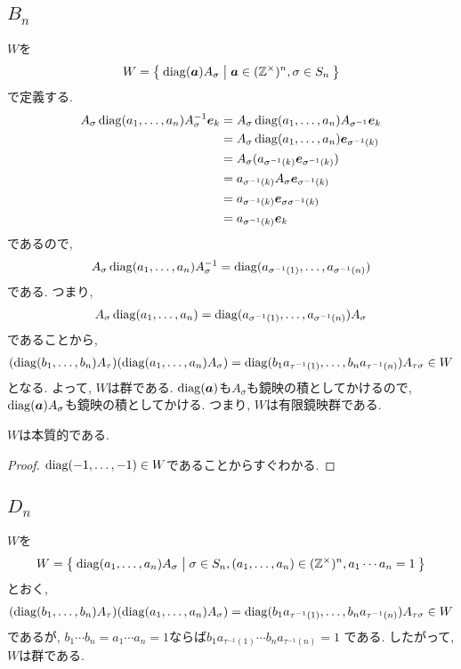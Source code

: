 \subsection{$B_n$}
\label{ex:bn:grp}
$W$を
\begin{align*}
  W=\Set{\operatorname{diag}(\boldsymbol{a})A_\sigma|\boldsymbol{a}\in (\mathbb{Z}^\times)^n, \sigma\in S_n}
\end{align*}
で定義する.
\begin{align*}
  A_\sigma \operatorname{diag}(a_1,\ldots,a_n)A_{\sigma}^{-1}\boldsymbol{e}_{k}
&=  A_\sigma \operatorname{diag}(a_1,\ldots,a_n)A_{\sigma^{-1}}\boldsymbol{e}_{k}\\
&=  A_\sigma \operatorname{diag}(a_1,\ldots,a_n)\boldsymbol{e}_{\sigma^{-1}(k)}\\
&=  A_\sigma (a_{\sigma^{-1}(k)}\boldsymbol{e}_{\sigma^{-1}(k)})\\  
&=  a_{\sigma^{-1}(k)}A_\sigma \boldsymbol{e}_{\sigma^{-1}(k)}\\  
&=  a_{\sigma^{-1}(k)} \boldsymbol{e}_{\sigma\sigma^{-1}(k)}\\  
&=  a_{\sigma^{-1}(k)} \boldsymbol{e}_{k}\\  
\end{align*}
であるので,
\begin{align*}
  A_\sigma \operatorname{diag}(a_1,\ldots,a_n)A_{\sigma}^{-1}
  =\operatorname{diag}(a_{\sigma^{-1}(1)},\ldots,a_{\sigma^{-1}(n)})
\end{align*}
である.  つまり,
\begin{align*}
  A_\sigma \operatorname{diag}(a_1,\ldots,a_n)
  =\operatorname{diag}(a_{\sigma^{-1}(1)},\ldots,a_{\sigma^{-1}(n)})A_{\sigma}
\end{align*}
であることから,
\begin{align*}
  (\operatorname{diag}(b_1,\ldots,b_n)A_\tau)( \operatorname{diag}(a_1,\ldots,a_n)A_{\sigma})
  =\operatorname{diag}(b_1a_{\tau^{-1}(1)},\ldots,b_na_{\tau^{-1}(n)})A_{\tau\sigma} \in W
\end{align*}
となる.
よって, $W$は群である.
$\operatorname{diag}(\boldsymbol{a})$も$A_\sigma$も鏡映の積としてかけるので,
$\operatorname{diag}(\boldsymbol{a})A_\sigma$も鏡映の積としてかける.
つまり, $W$は有限鏡映群である.

\begin{prop}
  $W$は本質的である.
\end{prop}
\begin{proof}
$\operatorname{diag}(-1,\ldots,-1)\in W$であることからすぐわかる.
\end{proof}


\subsection{$D_n$}
\label{ex:dn:grp}
$W$を
\begin{align*}
  W=\Set{ \operatorname{diag}(a_1,\ldots,a_n) A_{\sigma} | \sigma\in S_n , (a_1,\ldots,a_n)\in (\mathbb{Z}^{\times})^n, a_1\cdots a_n =1}
\end{align*}
とおく,
\begin{align*}
  (\operatorname{diag}(b_1,\ldots,b_n)A_\tau)( \operatorname{diag}(a_1,\ldots,a_n)A_{\sigma})
  =\operatorname{diag}(b_1a_{\tau^{-1}(1)},\ldots,b_na_{\tau^{-1}(n)})A_{\tau\sigma} \in W
\end{align*}
であるが, $b_1\cdots b_n=a_1\cdots a_n=1$ならば$b_1a_{\tau^{-1}(1)}\cdots b_na_{\tau^{-1}(n)}=1$
である. したがって,
$W$は群である.

